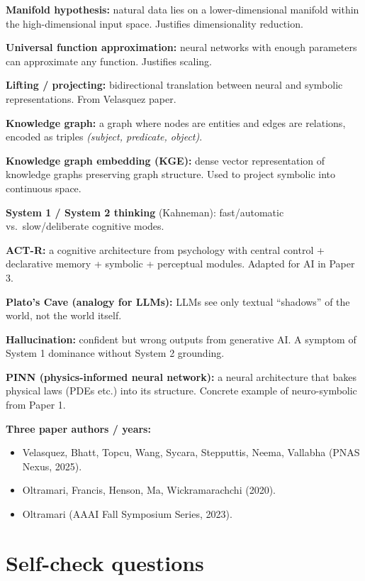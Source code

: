 \documentclass[11pt, a4paper]{article}
\begin{document}
\textbf{Manifold hypothesis:} natural data lies on a lower-dimensional manifold within the high-dimensional input space. Justifies dimensionality reduction.

\textbf{Universal function approximation:} neural networks with enough parameters can approximate any function. Justifies scaling.

\textbf{Lifting / projecting:} bidirectional translation between neural and symbolic representations. From Velasquez paper.

\textbf{Knowledge graph:} a graph where nodes are entities and edges are relations, encoded as triples \emph{(subject, predicate, object)}.

\textbf{Knowledge graph embedding (KGE):} dense vector representation of knowledge graphs preserving graph structure. Used to project symbolic into continuous space.

\textbf{System 1 / System 2 thinking} (Kahneman): fast/automatic vs.\ slow/deliberate cognitive modes.

\textbf{ACT-R:} a cognitive architecture from psychology with central control + declarative memory + symbolic + perceptual modules. Adapted for AI in Paper 3.

\textbf{Plato's Cave (analogy for LLMs):} LLMs see only textual ``shadows'' of the world, not the world itself.

\textbf{Hallucination:} confident but wrong outputs from generative AI. A symptom of System 1 dominance without System 2 grounding.

\textbf{PINN (physics-informed neural network):} a neural architecture that bakes physical laws (PDEs etc.) into its structure. Concrete example of neuro-symbolic from Paper 1.

\textbf{Three paper authors / years:}
\begin{itemize}[itemsep=0pt, topsep=0pt]
  \item Velasquez, Bhatt, Topcu, Wang, Sycara, Stepputtis, Neema, Vallabha (PNAS Nexus, 2025).
  \item Oltramari, Francis, Henson, Ma, Wickramarachchi (2020).
  \item Oltramari (AAAI Fall Symposium Series, 2023).
\end{itemize}

\section*{Self-check questions}
\end{document}
